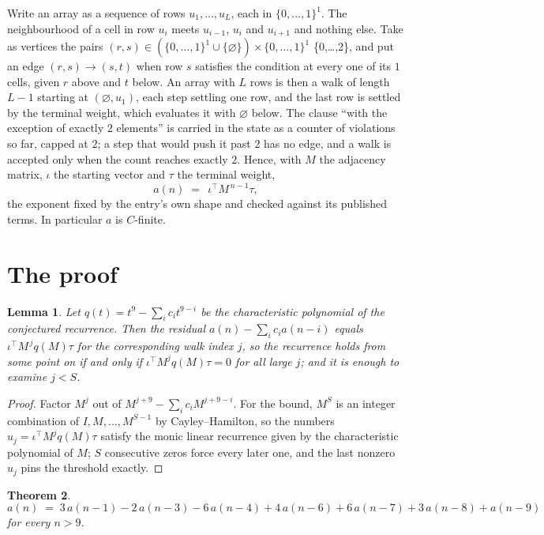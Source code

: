 \documentclass[11pt,a4paper]{article}
\theoremstyle{plain}
\newtheorem{theorem}{Theorem}
\newtheorem{lemma}[theorem]{Lemma}
\theoremstyle{definition}
\begin{document}
Write an array as a sequence of rows $u_1,\dots,u_L$, each in
$\{0,\dots,1\}^{1}$. The neighbourhood of a cell in row $u_i$ meets $u_{i-1}$,
$u_i$ and $u_{i+1}$ and nothing else. Take as vertices the pairs
$(r,s)\in(\{0,\dots,1\}^{1}\cup\{\varnothing\})\times\{0,\dots,1\}^{1}$ \times \{0,\dots,2\},
and put an edge $(r,s)\to(s,t)$ when row $s$ satisfies the condition at every one of its
$1$ cells, given $r$ above and $t$ below. An array with $L$ rows is then a walk of length
$L-1$ starting at $(\varnothing,u_1)$, each step settling one row, and the last row is
settled by the terminal weight, which evaluates it with $\varnothing$ below. The clause ``with the exception of exactly $2$ elements'' is carried in
the state as a counter of violations so far, capped at $2$; a step that would push it past
$2$ has no edge, and a walk is accepted only when the count reaches exactly $2$. Hence,
with $M$ the adjacency matrix, $\iota$ the starting vector and $\tau$ the terminal weight,
\[
a(n)\;=\;\,\iota^{\!\top}M^{\,n-1}\tau ,
\]
the exponent fixed by the entry's own shape and checked against its published terms. In
particular $a$ is $C$-finite.

\section{The proof}

\begin{lemma}\label{lem:crit}
Let $q(t)=t^{9}-\sum_i c_it^{9-i}$ be the characteristic polynomial of the
conjectured recurrence. Then the residual $a(n)-\sum_ic_ia(n-i)$ equals
$\iota^{\!\top}M^{\,j}q(M)\tau$ for the corresponding walk index $j$, so the
recurrence holds from some point on if and only if $\iota^{\!\top}M^{j}q(M)\tau=0$ for all
large $j$; and it is enough to examine $j<S$.
\end{lemma}

\begin{proof}
Factor $M^{j}$ out of $M^{j+9}-\sum_ic_iM^{j+9-i}$. For the bound, $M^{S}$
is an integer combination of $I,M,\dots,M^{S-1}$ by Cayley--Hamilton, so the numbers
$u_j=\iota^{\!\top}M^{j}q(M)\tau$ satisfy the monic linear recurrence given by the
characteristic polynomial of $M$; $S$ consecutive zeros force every later one, and the last
nonzero $u_j$ pins the threshold exactly.
\end{proof}

\begin{theorem}
\[
a(n)\;=\;3\,a(n-1) - 2\,a(n-3) - 6\,a(n-4) + 4\,a(n-6) + 6\,a(n-7) + 3\,a(n-8) + a(n-9)
\]
for every $n>9$.
\end{theorem}
\end{document}
